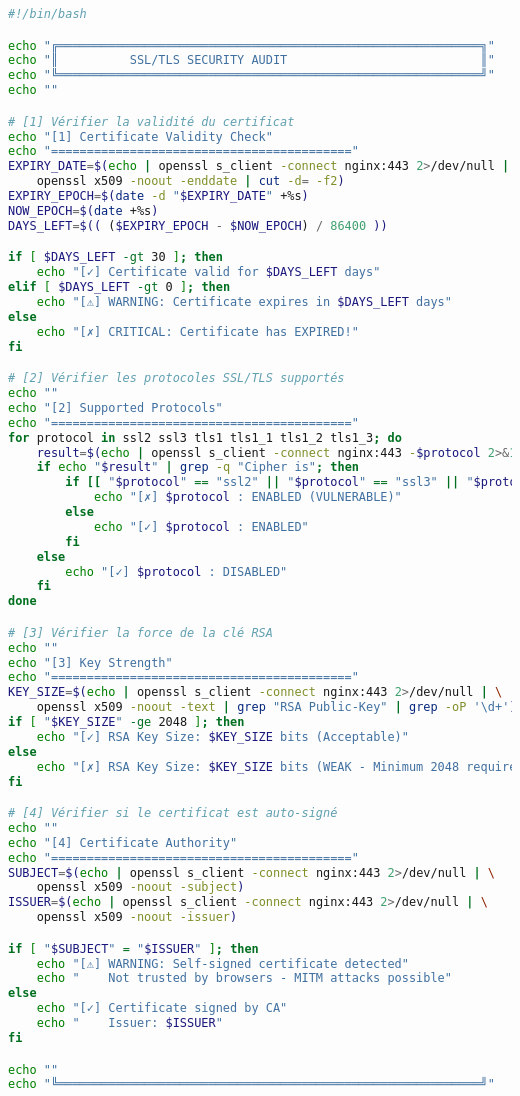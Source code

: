 \documentclass[11pt,a4paper]{report}
\begin{document}
\begin{lstlisting}[language=bash, caption=Script d'Audit SSL Complet]
#!/bin/bash

echo "╔═══════════════════════════════════════════════════════════╗"
echo "║          SSL/TLS SECURITY AUDIT                           ║"
echo "╚═══════════════════════════════════════════════════════════╝"
echo ""

# [1] Vérifier la validité du certificat
echo "[1] Certificate Validity Check"
echo "=========================================="
EXPIRY_DATE=$(echo | openssl s_client -connect nginx:443 2>/dev/null | \
    openssl x509 -noout -enddate | cut -d= -f2)
EXPIRY_EPOCH=$(date -d "$EXPIRY_DATE" +%s)
NOW_EPOCH=$(date +%s)
DAYS_LEFT=$(( ($EXPIRY_EPOCH - $NOW_EPOCH) / 86400 ))

if [ $DAYS_LEFT -gt 30 ]; then
    echo "[✓] Certificate valid for $DAYS_LEFT days"
elif [ $DAYS_LEFT -gt 0 ]; then
    echo "[⚠] WARNING: Certificate expires in $DAYS_LEFT days"
else
    echo "[✗] CRITICAL: Certificate has EXPIRED!"
fi

# [2] Vérifier les protocoles SSL/TLS supportés
echo ""
echo "[2] Supported Protocols"
echo "=========================================="
for protocol in ssl2 ssl3 tls1 tls1_1 tls1_2 tls1_3; do
    result=$(echo | openssl s_client -connect nginx:443 -$protocol 2>&1)
    if echo "$result" | grep -q "Cipher is"; then
        if [[ "$protocol" == "ssl2" || "$protocol" == "ssl3" || "$protocol" == "tls1" ]]; then
            echo "[✗] $protocol : ENABLED (VULNERABLE)"
        else
            echo "[✓] $protocol : ENABLED"
        fi
    else
        echo "[✓] $protocol : DISABLED"
    fi
done

# [3] Vérifier la force de la clé RSA
echo ""
echo "[3] Key Strength"
echo "=========================================="
KEY_SIZE=$(echo | openssl s_client -connect nginx:443 2>/dev/null | \
    openssl x509 -noout -text | grep "RSA Public-Key" | grep -oP '\d+')
if [ "$KEY_SIZE" -ge 2048 ]; then
    echo "[✓] RSA Key Size: $KEY_SIZE bits (Acceptable)"
else
    echo "[✗] RSA Key Size: $KEY_SIZE bits (WEAK - Minimum 2048 required)"
fi

# [4] Vérifier si le certificat est auto-signé
echo ""
echo "[4] Certificate Authority"
echo "=========================================="
SUBJECT=$(echo | openssl s_client -connect nginx:443 2>/dev/null | \
    openssl x509 -noout -subject)
ISSUER=$(echo | openssl s_client -connect nginx:443 2>/dev/null | \
    openssl x509 -noout -issuer)

if [ "$SUBJECT" = "$ISSUER" ]; then
    echo "[⚠] WARNING: Self-signed certificate detected"
    echo "    Not trusted by browsers - MITM attacks possible"
else
    echo "[✓] Certificate signed by CA"
    echo "    Issuer: $ISSUER"
fi

echo ""
echo "╚═══════════════════════════════════════════════════════════╝"
\end{lstlisting}
\end{document}
